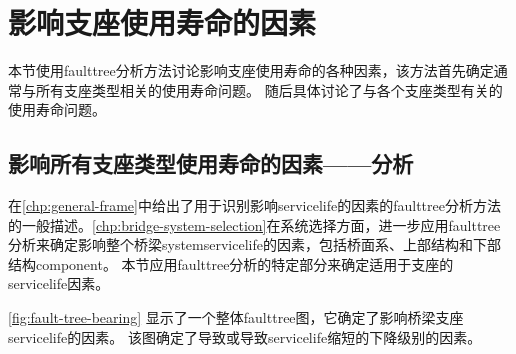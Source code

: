 \section{影响支座使用寿命的因素}

本节使用\gls*{faulttree}分析方法讨论影响支座使用寿命的各种因素，该方法首先确定通常与所有支座类型相关的使用寿命问题。 随后具体讨论了与各个支座类型有关的使用寿命问题。

\subsection{影响所有支座类型使用寿命的因素——分析}

在\cref{chp:general-frame}中给出了用于识别影响\gls*{servicelife}的因素的\gls*{faulttree}分析方法的一般描述。\cref{chp:bridge-system-selection}在系统选择方面，进一步应用\gls*{faulttree}分析来确定影响整个桥梁\gls*{system}\gls*{servicelife}的因素，包括桥面系、上部结构和下部结构\gls*{component}。 本节应用\gls*{faulttree}分析的特定部分来确定适用于支座的\gls*{servicelife}因素。

\cref{fig:fault-tree-bearing} 显示了一个整体\gls*{faulttree}图，它确定了影响桥梁支座\gls*{servicelife}的因素。 该图确定了导致或导致\gls*{servicelife}缩短的下降级别的因素。

